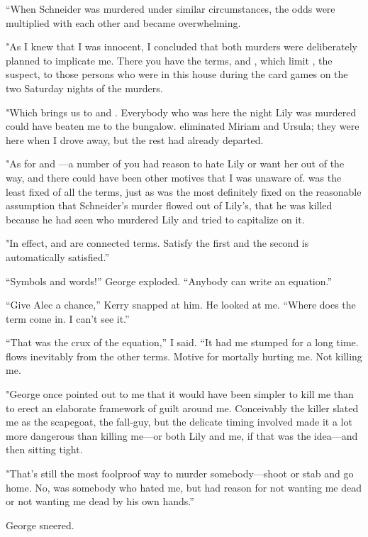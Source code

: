 \documentclass{novel}
\begin{document}
“When Schneider was murdered under similar circumstances, the odds were multiplied with each other and became overwhelming.

"As I knew that I was innocent, I concluded that both murders were deliberately planned to implicate me. There you have the terms,  and , which limit , the suspect, to those persons who were in this house during the card games on the two Saturday nights of the murders.

"Which brings us to  and . Everybody who was here the night Lily was murdered could have beaten me to the bungalow.  eliminated Miriam and Ursula; they were here when I drove away, but the rest had already departed.

"As for  and —a number of you had reason to hate Lily or want her out of the way, and there could have been other motives that I was unaware of.  was the least fixed of all the terms, just as  was the most definitely fixed on the reasonable assumption that Schneider’s murder flowed out of Lily’s, that he was killed because he had seen who murdered Lily and tried to capitalize on it.

"In effect,  and  are connected terms. Satisfy the first and the second is automatically satisfied.”

“Symbols and words!” George exploded. “Anybody can write an equation.”

“Give Alec a chance,” Kerry snapped at him. He looked at me. “Where does the  term come in. I can’t see it.”

“That was the crux of the equation,” I said. “It had me stumped for a long time.  flows inevitably from the other terms. Motive for mortally hurting me. Not killing me.

"George once pointed out to me that it would have been simpler to kill me than to erect an elaborate framework of guilt around me. Conceivably the killer slated me as the scapegoat, the fall-guy, but the delicate timing involved made it a lot more dangerous than killing me—or both Lily and me, if that was the idea—and then sitting tight.

"That’s still the most foolproof way to murder somebody—shoot or stab and go home. No,  was somebody who hated me, but had reason for not wanting me dead or not wanting me dead by his own hands.”

George sneered.
\end{document}
